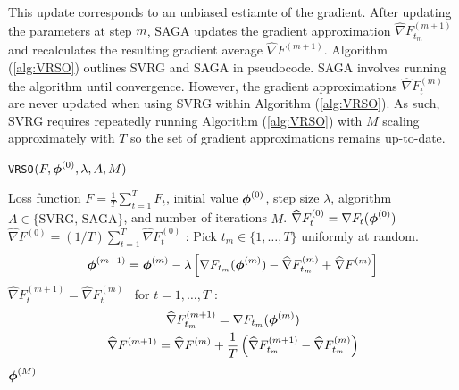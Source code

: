 %
This update corresponds to an unbiased estiamte of the gradient. After updating the parameters at step $m$, SAGA updates the gradient approximation $\widehat \nabla F_{t_m}^{(m+1)}$ and recalculates the resulting gradient average $\widehat \nabla F^{(m+1)}$.
%
%
%
%
Algorithm (\ref{alg:VRSO}) outlines SVRG and SAGA in pseudocode. SAGA involves running the algorithm until convergence. However, the gradient approximations $\widehat \nabla F_{t}^{(m)}$ are never updated when using SVRG within Algorithm (\ref{alg:VRSO}). As such, SVRG requires repeatedly running Algorithm (\ref{alg:VRSO}) with $M$ scaling approximately with $T$ so the set of gradient approximations remains up-to-date.

\begin{algorithm}
\caption{\texttt{VRSO}$(F,\boldsymbol{\phi}^{(0)},\lambda,A,M)$}\label{alg:VRSO}
\begin{algorithmic}[1]
\Require Loss function $F = \frac{1}{T}\sum_{t=1}^T F_t$, initial value $\boldsymbol{\phi}^{(0)}$, step size $\lambda$, algorithm $A \in \{\text{SVRG, SAGA}\}$, and number of iterations $M$.
%
\vspace{5pt}
 
\State $\widehat \nabla F_{t}^{(0)} = \nabla F_t (\boldsymbol{\phi}^{(0)})$
\EndFor
\State $\widehat \nabla F^{(0)} = (1/T) \sum_{t=1}^T \widehat \nabla F_{t}^{(0)}$
%
:
    \State Pick $t_m \in \{1,\ldots,T\}$ uniformly at random.
    \State {}
    \begin{gather}
        \boldsymbol{\phi}^{(m+1)} = \boldsymbol{\phi}^{(m)} - \lambda \left[\nabla F_{t_m}(\boldsymbol{\phi}^{(m)}) - \widehat \nabla F_{t_m}^{(m)} + \widehat \nabla F^{(m)} \right]
        \label{eqn:SAGA_update0}
    \end{gather}
    \State $\widehat \nabla F_{t}^{(m+1)} = \widehat \nabla F_{t}^{(m)} \enspace$ for $t = 1,\ldots,T$ 
    :
        \begin{gather}
            \widehat \nabla F_{t_m}^{(m+1)} = \nabla F_{t_m}(\boldsymbol{\phi}^{(m)}) \\
            \widehat \nabla F^{(m+1)} = \widehat \nabla F^{(m)} + \frac{1}{T} \left(\widehat \nabla F_{t_m}^{(m+1)} - \widehat \nabla F_{t_m}^{(m)}\right)
        \end{gather}
    \EndIf
\EndFor
\State \Return $\boldsymbol{\phi}^{(M)}$
\end{algorithmic}
\end{algorithm}

